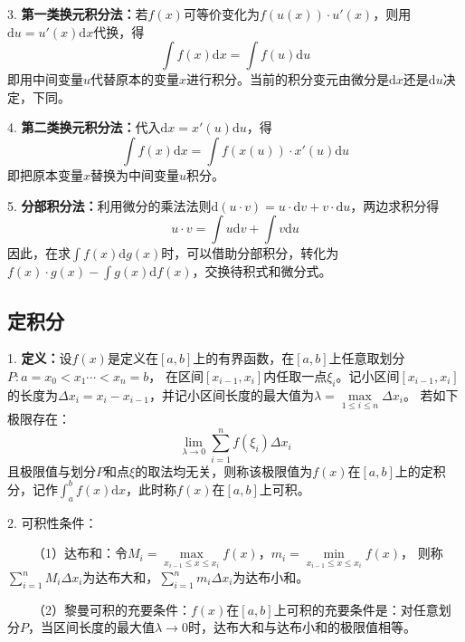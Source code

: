 3. \textbf{第一类换元积分法：}若$f(x)$可等价变化为$f\left(u(x)\right)\cdot u'(x)$，则用$\mathrm{d}u=u'(x)\mathrm{d}x$代换，得
\begin{equation*}
    \int f(x)\mathrm{d} x =\int f(u)\mathrm{d}u
\end{equation*}
即用中间变量$u$代替原本的变量$x$进行积分。当前的积分变元由微分是$\mathrm{d}x$还是$\mathrm{d}u$决定，下同。

4. \textbf{第二类换元积分法：}代入$\mathrm{d}x =x'(u)\mathrm{d}u$，得
\begin{equation*}
    \int f(x)\mathrm{d} x =\int f\left(x(u)\right)\cdot x'(u)\mathrm{d} u 
\end{equation*}
即把原本变量$x$替换为中间变量$u$积分。

5. \textbf{分部积分法：}利用微分的乘法法则$\mathrm{d}(u\cdot v)=u\cdot \mathrm{d}v +v\cdot \mathrm{d}u$，两边求积分得
\begin{equation*}
    u\cdot v =\int u \mathrm{d}v+\int v\mathrm{d}u
\end{equation*}
因此，在求$\int f(x)\mathrm{d} g(x)$时，可以借助分部积分，转化为$f(x)\cdot g(x)-\int g(x)\mathrm{d}f(x)$，交换待积式和微分式。

\subsection{定积分}

1. \textbf{定义：}设$f(x)$是定义在$[a,b]$上的有界函数，在$[a,b]$上任意取划分$P:a=x_0<x_1\cdots<x_n=b$，
在区间$[x_{i-1},x_i]$内任取一点$\xi_i$。记小区间$[x_{i-1},x_i]$的长度为$\Delta x_i=x_i-x_{i-1}$，并记小区间长度的最大值为$\lambda=\max\limits_{1\leqslant i\leqslant n} \Delta x_i$。
若如下极限存在：
\begin{equation*}
    \lim\limits_{\lambda \rightarrow 0} \sum\limits_{i=1}^n f\left(\xi_i\right)\Delta x_i
\end{equation*}
且极限值与划分$P$和点$\xi$的取法均无关，则称该极限值为$f(x)$在$[a,b]$上的定积分，记作$\int_a^b f(x)\mathrm{d}x$，此时称$f(x)$在$[a,b]$上可积。

2. 可积性条件：

~~~~（1）达布和：令$M_i=\max\limits_{x_{i-1}\leqslant x\leqslant x_i}f(x)$，$m_i=\min\limits_{x_{i-1}\leqslant x\leqslant x_i}f(x)$，
则称$\sum\limits_{i=1}^n M_i\Delta x_i$为达布大和，$\sum\limits_{i=1}^n m_i\Delta x_i$为达布小和。

~~~~（2）黎曼可积的充要条件：$f(x)$在$[a,b]$上可积的充要条件是：对任意划分$P$，当区间长度的最大值$\lambda \rightarrow 0 $时，达布大和与达布小和的极限值相等。

